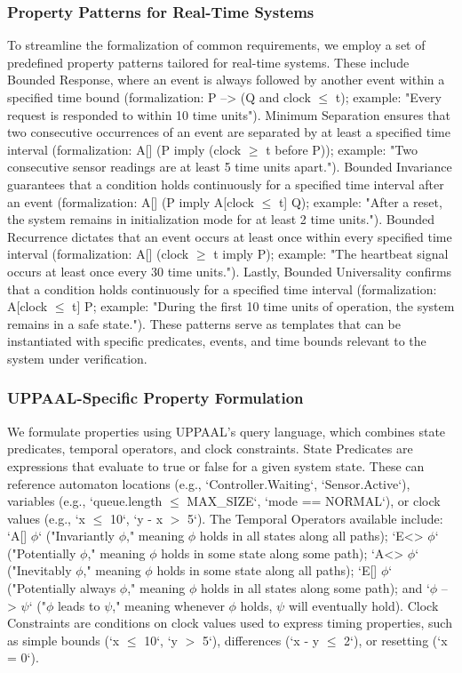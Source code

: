 \subsubsection{Property Patterns for Real-Time Systems}
To streamline the formalization of common requirements, we employ a set of predefined property patterns tailored for real-time systems. These include Bounded Response, where an event is always followed by another event within a specified time bound (formalization: P --> (Q and clock $\leq$ t); example: "Every request is responded to within 10 time units"). Minimum Separation ensures that two consecutive occurrences of an event are separated by at least a specified time interval (formalization: A[] (P imply (clock $\geq$ t before P)); example: "Two consecutive sensor readings are at least 5 time units apart."). Bounded Invariance guarantees that a condition holds continuously for a specified time interval after an event (formalization: A[] (P imply A[clock $\leq$ t] Q); example: "After a reset, the system remains in initialization mode for at least 2 time units."). Bounded Recurrence dictates that an event occurs at least once within every specified time interval (formalization: A[] (clock $\geq$ t imply P); example: "The heartbeat signal occurs at least once every 30 time units."). Lastly, Bounded Universality confirms that a condition holds continuously for a specified time interval (formalization: A[clock $\leq$ t] P; example: "During the first 10 time units of operation, the system remains in a safe state."). These patterns serve as templates that can be instantiated with specific predicates, events, and time bounds relevant to the system under verification.

\subsubsection{UPPAAL-Specific Property Formulation}
We formulate properties using UPPAAL's query language, which combines state predicates, temporal operators, and clock constraints. State Predicates are expressions that evaluate to true or false for a given system state. These can reference automaton locations (e.g., `Controller.Waiting`, `Sensor.Active`), variables (e.g., `queue.length $\leq$ MAX\_SIZE`, `mode == NORMAL`), or clock values (e.g., `x $\leq$ 10`, `y - x $>$ 5`). The Temporal Operators available include: `A[] $\phi$` ("Invariantly $\phi$," meaning $\phi$ holds in all states along all paths); `E<> $\phi$` ("Potentially $\phi$," meaning $\phi$ holds in some state along some path); `A<> $\phi$` ("Inevitably $\phi$," meaning $\phi$ holds in some state along all paths); `E[] $\phi$` ("Potentially always $\phi$," meaning $\phi$ holds in all states along some path); and `$\phi$ --> $\psi$` ("$\phi$ leads to $\psi$," meaning whenever $\phi$ holds, $\psi$ will eventually hold). Clock Constraints are conditions on clock values used to express timing properties, such as simple bounds (`x $\leq$ 10`, `y $>$ 5`), differences (`x - y $\leq$ 2`), or resetting (`x = 0`).

